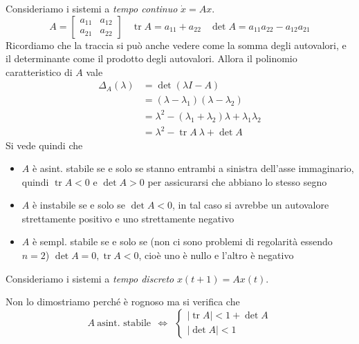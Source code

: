 \documentclass[10pt,a4paper]{book}
\DeclareMathOperator{\tr}{tr}
\begin{document}
Consideriamo i sistemi a \textit{tempo continuo} $\dot{x} =Ax$.
\begin{equation*}
	A=\begin{bmatrix}
	a_{11} & a_{12}\\
	a_{21} & a_{22}
	\end{bmatrix} \ \ \ \ \tr A=a_{11} +a_{22} \ \ \ \ \det A=a_{11} a_{22} -a_{12} a_{21}
\end{equation*}
Ricordiamo che la traccia si può anche vedere come la somma degli autovalori, e il determinante come il prodotto degli autovalori. Allora il polinomio caratteristico di $A$ vale
\begin{equation*}
	\begin{aligned}
		\Delta _A\left(\lambda \right) & =\det\left(\lambda I-A\right)                                                   \\
		                               & =\left(\lambda -\lambda _1\right)\left(\lambda -\lambda _2\right)               \\
		                               & =\lambda ^2 -\left(\lambda _1 +\lambda _2\right) \lambda +\lambda _1 \lambda _2 \\
		                               & =\lambda ^2 -\tr A\ \lambda +\det A                                             
	\end{aligned}
\end{equation*}
Si vede quindi che
\begin{itemize}
	\item $A$ è asint. stabile se e solo se stanno entrambi a sinistra dell'asse immaginario, quindi $\tr A< 0$ e $\det A >0$ per assicurarsi che abbiano lo stesso segno
	\item $A$ è instabile se e solo se $\det A< 0$, in tal caso si avrebbe un autovalore strettamente positivo e uno strettamente negativo
	\item $A$ è sempl. stabile se e solo se (non ci sono problemi di regolarità essendo $n=2$) $\det A=0,\tr A< 0$, cioè uno è nullo e l'altro è negativo
\end{itemize}

Consideriamo i sistemi a \textit{tempo discreto} $x\left(t+1\right) =Ax\left(t\right)$.

Non lo dimostriamo perché è rognoso ma si verifica che
\begin{equation*}
	A\ \text{asint. stabile} \ \ \Leftrightarrow \ \ \begin{cases}
	\left| \tr A\right| < 1+\det A\\
	\left| \det A\right| < 1
	\end{cases}
\end{equation*}
\end{document}
